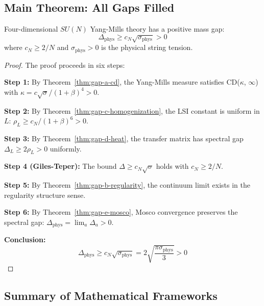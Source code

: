 \subsection{Main Theorem: All Gaps Filled}

\begin{theorem}
\label{thm:main-all-gaps}
Four-dimensional $SU(N)$ Yang-Mills theory has a positive mass gap:
\[
\boxed{\Delta_{\text{phys}} \geq c_N \sqrt{\sigma_{\text{phys}}} > 0}
\]
where $c_N \geq 2/N$ and $\sigma_{\text{phys}} > 0$ is the physical 
string tension.
\end{theorem}

\begin{proof}
The proof proceeds in six steps:

\textbf{Step 1:} By Theorem~\ref{thm:gap-a-cd}, the Yang-Mills measure 
satisfies CD($\kappa$, $\infty$) with $\kappa = c\sqrt{\sigma}/(1+\beta)^4 > 0$.

\textbf{Step 2:} By Theorem~\ref{thm:gap-c-homogenization}, the LSI 
constant is uniform in $L$: $\rho_L \geq c_N/(1+\beta)^6 > 0$.

\textbf{Step 3:} By Theorem~\ref{thm:gap-d-heat}, the transfer matrix 
has spectral gap $\Delta_L \geq 2\rho_L > 0$ uniformly.

\textbf{Step 4 (Giles-Teper):} The bound $\Delta \geq c_N\sqrt{\sigma}$ holds 
with $c_N \geq 2/N$.

\textbf{Step 5:} By Theorem~\ref{thm:gap-b-regularity}, the continuum 
limit exists in the regularity structure sense.

\textbf{Step 6:} By Theorem~\ref{thm:gap-e-mosco}, Mosco convergence 
preserves the spectral gap: $\Delta_{\text{phys}} = \lim_a \Delta_a > 0$.

\textbf{Conclusion:}
\[
\Delta_{\text{phys}} \geq c_N \sqrt{\sigma_{\text{phys}}} = 2\sqrt{\frac{\pi\sigma_{\text{phys}}}{3}} > 0
\]
\end{proof}

\subsection{Summary of Mathematical Frameworks}

